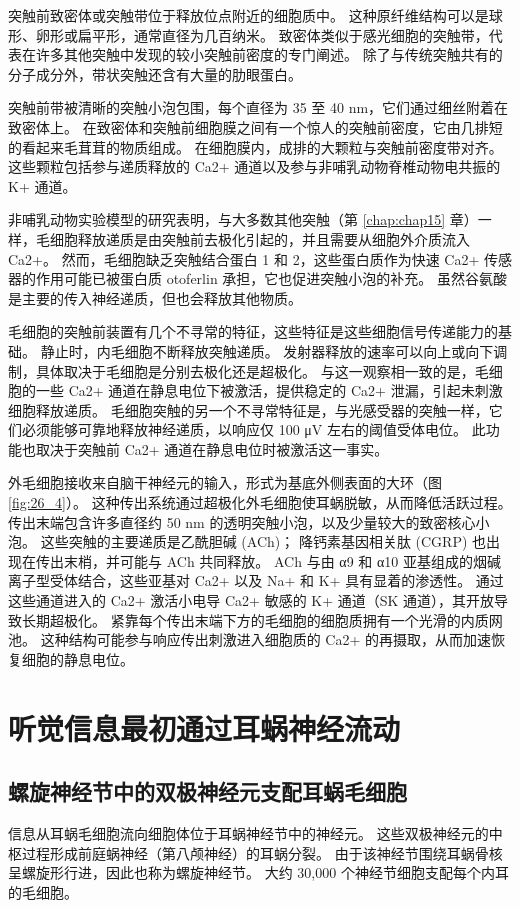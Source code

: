 突触前致密体或突触带位于释放位点附近的细胞质中。 这种原纤维结构可以是球形、卵形或扁平形，通常直径为几百纳米。 致密体类似于感光细胞的突触带，代表在许多其他突触中发现的较小突触前密度的专门阐述。 除了与传统突触共有的分子成分外，带状突触还含有大量的肋眼蛋白。

突触前带被清晰的突触小泡包围，每个直径为 35 至 40 nm，它们通过细丝附着在致密体上。 在致密体和突触前细胞膜之间有一个惊人的突触前密度，它由几排短的看起来毛茸茸的物质组成。 在细胞膜内，成排的大颗粒与突触前密度带对齐。 这些颗粒包括参与递质释放的 Ca2+ 通道以及参与非哺乳动物脊椎动物电共振的 K+ 通道。

非哺乳动物实验模型的研究表明，与大多数其他突触（第 \ref{chap:chap15} 章）一样，毛细胞释放递质是由突触前去极化引起的，并且需要从细胞外介质流入 Ca2+。 然而，毛细胞缺乏突触结合蛋白 1 和 2，这些蛋白质作为快速 Ca2+ 传感器的作用可能已被蛋白质 otoferlin 承担，它也促进突触小泡的补充。 虽然谷氨酸是主要的传入神经递质，但也会释放其他物质。

毛细胞的突触前装置有几个不寻常的特征，这些特征是这些细胞信号传递能力的基础。 静止时，内毛细胞不断释放突触递质。 发射器释放的速率可以向上或向下调制，具体取决于毛细胞是分别去极化还是超极化。 与这一观察相一致的是，毛细胞的一些 Ca2+ 通道在静息电位下被激活，提供稳定的 Ca2+ 泄漏，引起未刺激细胞释放递质。 毛细胞突触的另一个不寻常特征是，与光感受器的突触一样，它们必须能够可靠地释放神经递质，以响应仅 100 μV 左右的阈值受体电位。 此功能也取决于突触前 Ca2+ 通道在静息电位时被激活这一事实。

外毛细胞接收来自脑干神经元的输入，形式为基底外侧表面的大环（图 \ref{fig:26_4}）。 这种传出系统通过超极化外毛细胞使耳蜗脱敏，从而降低活跃过程。 传出末端包含许多直径约 50 nm 的透明突触小泡，以及少量较大的致密核心小泡。 这些突触的主要递质是乙酰胆碱 (ACh)； 降钙素基因相关肽 (CGRP) 也出现在传出末梢，并可能与 ACh 共同释放。 ACh 与由 α9 和 α10 亚基组成的烟碱离子型受体结合，这些亚基对 Ca2+ 以及 Na+ 和 K+ 具有显着的渗透性。 通过这些通道进入的 Ca2+ 激活小电导 Ca2+ 敏感的 K+ 通道（SK 通道），其开放导致长期超极化。 紧靠每个传出末端下方的毛细胞的细胞质拥有一个光滑的内质网池。 这种结构可能参与响应传出刺激进入细胞质的 Ca2+ 的再摄取，从而加速恢复细胞的静息电位。


\section{听觉信息最初通过耳蜗神经流动}
\subsection{螺旋神经节中的双极神经元支配耳蜗毛细胞}
信息从耳蜗毛细胞流向细胞体位于耳蜗神经节中的神经元。 这些双极神经元的中枢过程形成前庭蜗神经（第八颅神经）的耳蜗分裂。 由于该神经节围绕耳蜗骨核呈螺旋形行进，因此也称为螺旋神经节。 大约 30,000 个神经节细胞支配每个内耳的毛细胞。

